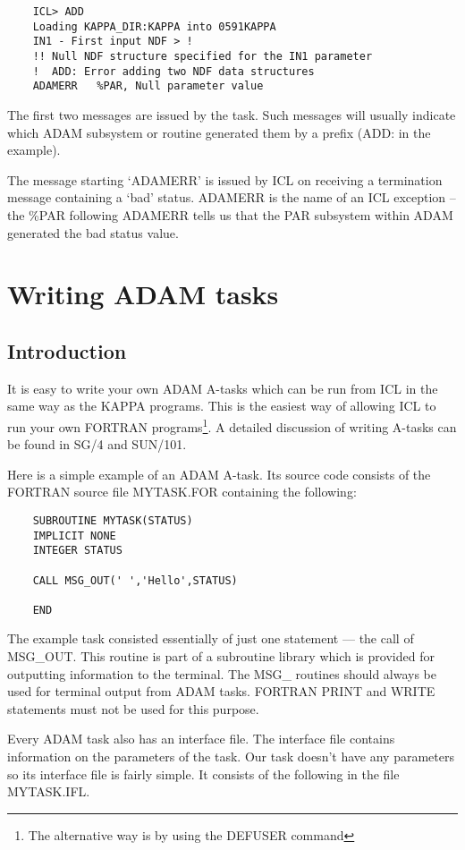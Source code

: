 \begin{verbatim}
    ICL> ADD
    Loading KAPPA_DIR:KAPPA into 0591KAPPA
    IN1 - First input NDF > !
    !! Null NDF structure specified for the IN1 parameter
    !  ADD: Error adding two NDF data structures
    ADAMERR   %PAR, Null parameter value
\end{verbatim}

The first two messages are issued by the task. Such messages will usually
indicate which ADAM subsystem or routine generated them by a prefix (ADD:
in the example).

The message starting `ADAMERR' is issued by ICL on receiving a termination
message containing a `bad' status.
ADAMERR is the name of an ICL exception -- the \%PAR following ADAMERR tells 
us that the PAR subsystem within ADAM generated the bad status value.


\chapter{Writing ADAM tasks}

\section{Introduction}

It is easy to write your own ADAM A-tasks which can be run from ICL in the
same way as the KAPPA programs. This is the easiest way of allowing ICL
to run your own FORTRAN programs\footnote{The alternative way is by using
the DEFUSER command}.
A detailed discussion of writing A-tasks can be found in SG/4 and SUN/101.

Here is a simple example of an ADAM A-task. Its source code consists of
the FORTRAN source file MYTASK.FOR containing the following:

\begin{verbatim}                   
    SUBROUTINE MYTASK(STATUS)
    IMPLICIT NONE
    INTEGER STATUS

    CALL MSG_OUT(' ','Hello',STATUS)

    END
\end{verbatim}
The example task consisted essentially of just one statement --- the call
of MSG\_OUT. This routine is part of a subroutine library which is provided
for outputting information to the terminal. The MSG\_ routines should always
be used for terminal output from ADAM tasks. FORTRAN PRINT and WRITE statements
must not be used for this purpose.

Every ADAM task also has an interface file. The interface file contains
information on the parameters of the task. Our task doesn't have any parameters
so its interface file is fairly simple. It consists of the following in
the file MYTASK.IFL.

